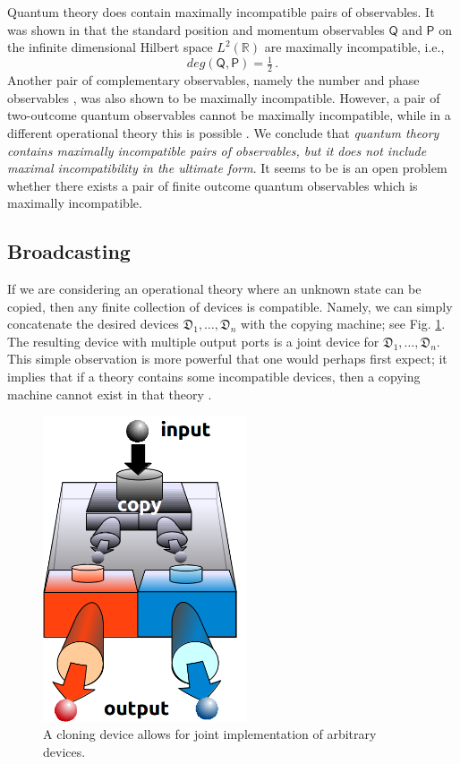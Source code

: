 \documentclass[12pt]{iopart}
\theoremstyle{definition}
\newcommand{\R}{\mathbb{R}} %
\newcommand{\half}{\tfrac{1}{2}} %
\newcommand{\Po}{\mathsf{P}}%
\newcommand{\Qo}{\mathsf{Q}}%
\newcommand{\Dev}{\mathfrak{D}} %
\begin{document}
Quantum theory does contain maximally incompatible pairs of observables. 
It was shown in \cite{HeScToZi14} that the standard position and momentum observables $\Qo$ and $\Po$ on the infinite dimensional Hilbert space $L^2(\R)$ are maximally incompatible, i.e., 
\begin{equation}\label{eq:pos-mom-true}
deg(\Qo,\Po) = \half \, .
\end{equation}
Another pair of complementary observables, namely the number and phase observables \cite{BuLaPeYl01}, was also shown to be maximally incompatible.
However, a pair of two-outcome quantum observables cannot be maximally incompatible, 
while in a different operational theory this is possible \cite{BuHeScSt13}.
We conclude that \emph{quantum theory contains maximally incompatible pairs of observables, but it does not include maximal incompatibility in the ultimate form}.
It seems to be is an open problem whether there exists a pair of finite outcome quantum observables which is maximally incompatible.


\subsection{Broadcasting}\label{sec:broadcasting}

If we are considering an operational theory where an unknown state can be copied, then any finite collection of devices is compatible. 
Namely, we can simply concatenate the desired devices $\Dev_1,\ldots,\Dev_n$ with the copying machine; see Fig. \ref{fig:cloning}.
The resulting device with multiple output ports is a joint device for $\Dev_1,\ldots,\Dev_n$.
This simple observation is more powerful that one would perhaps first expect; it implies that if a theory contains some incompatible devices, then a copying machine cannot exist in that theory \cite{QI01Werner}.

\begin{figure}\begin{center}
\includegraphics[width=6cm]{fig_cloning.png}
\caption{A cloning device allows for joint implementation of arbitrary devices.}
\label{fig:cloning}
\end{center}
\end{figure}
\end{document}
